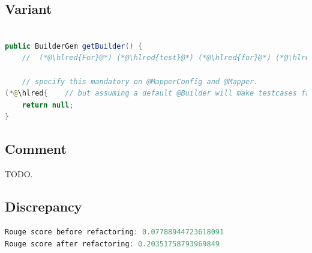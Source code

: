 \documentclass[usenames,dvipsnames]{article} %
\DeclareRobustCommand{\hlred}[1]{{\sethlcolor{pink}\hl{#1}}}
\begin{document}
\subsection{Variant}

\begin{lstlisting}[language=java]

public BuilderGem getBuilder() {
    //  (*@\hlred{For}@*) (*@\hlred{test}@*) (*@\hlred{for}@*) (*@\hlred{a}@*) (*@\hlred{method}@*) (*@\hlred{that}@*) (*@\hlred{that's}@*) (*@\hlred{this}@*) (*@\hlred{case}@*) (*@\hlred{is}@*) (*@\hlred{an}@*) (*@\hlred{Java}@*) (*@\hlred{class}@*) (*@\hlred{class}@*) (*@\hlred{as}@*) (*@\hlred{not}@*) (*@\hlred{an}@*) (*@\hlred{instance}@*)

    // specify this mandatory on @MapperConfig and @Mapper.
(*@\hlred{    // but assuming a default @Builder will make testcases fail. Not having a default means that you need to}@*)
    return null;
}
\end{lstlisting}

\subsection{Comment}

TODO.

\subsection{Discrepancy}

\begin{lstlisting}[language=java]
Rouge score before refactoring: 0.07788944723618091
Rouge score after refactoring: 0.20351758793969849
\end{lstlisting}
\end{document}
